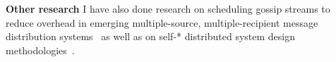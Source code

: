 \documentclass[10pt]{article}
\begin{document}
\noindent \textbf{Other research}
I have also done research on scheduling gossip streams to reduce
overhead in emerging multiple-source, multiple-recipient message distribution
systems~\cite{ucan:piggyback:midsens07} as well as on self-* distributed system
design methodologies~\cite{gupta:methodology:lncs05}.

\footnotesize


\end{document}
